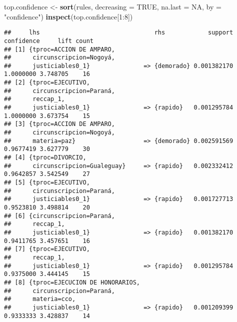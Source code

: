\documentclass[runningheads,a4paper]{llncs}
\newenvironment{Shaded}{\footnotesize}{}
\newcommand{\KeywordTok}[1]{\textcolor[rgb]{0.00,0.44,0.13}{\textbf{{#1}}}}
\newcommand{\DataTypeTok}[1]{\textcolor[rgb]{0.56,0.13,0.00}{{#1}}}
\newcommand{\DecValTok}[1]{\textcolor[rgb]{0.25,0.63,0.44}{{#1}}}
\newcommand{\StringTok}[1]{\textcolor[rgb]{0.25,0.44,0.63}{{#1}}}
\newcommand{\OtherTok}[1]{\textcolor[rgb]{0.00,0.44,0.13}{{#1}}}
\newcommand{\NormalTok}[1]{{#1}}
\newcommand{\OperatorTok}[1]{\textcolor[rgb]{0.40,0.40,0.40}{{#1}}}
\begin{document}
\scriptsize

\begin{Shaded}
\begin{Highlighting}[]
\NormalTok{top.confidence <-}\StringTok{ }\KeywordTok{sort}\NormalTok{(rules, }\DataTypeTok{decreasing =} \OtherTok{TRUE}\NormalTok{, }
                       \DataTypeTok{na.last =} \OtherTok{NA}\NormalTok{, }\DataTypeTok{by =} \StringTok{"confidence"}\NormalTok{)}
\KeywordTok{inspect}\NormalTok{(top.confidence[}\DecValTok{1}\OperatorTok{:}\DecValTok{8}\NormalTok{])}
\end{Highlighting}
\end{Shaded}

\begin{verbatim}
##     lhs                                rhs            support confidence     lift count
## [1] {tproc=ACCION DE AMPARO,                                                           
##      circunscripcion=Nogoyá,                                                           
##      justiciables0_1}               => {demorado} 0.001382170  1.0000000 3.748705    16
## [2] {tproc=EJECUTIVO,                                                                  
##      circunscripcion=Paraná,                                                           
##      reccap_1,                                                                         
##      justiciables0_1}               => {rapido}   0.001295784  1.0000000 3.673754    15
## [3] {tproc=ACCION DE AMPARO,                                                           
##      circunscripcion=Nogoyá,                                                           
##      materia=paz}                   => {demorado} 0.002591569  0.9677419 3.627779    30
## [4] {tproc=DIVORCIO,                                                                   
##      circunscripcion=Gualeguay}     => {rapido}   0.002332412  0.9642857 3.542549    27
## [5] {tproc=EJECUTIVO,                                                                  
##      circunscripcion=Paraná,                                                           
##      justiciables0_1}               => {rapido}   0.001727713  0.9523810 3.498814    20
## [6] {circunscripcion=Paraná,                                                           
##      reccap_1,                                                                         
##      justiciables0_1}               => {rapido}   0.001382170  0.9411765 3.457651    16
## [7] {tproc=EJECUTIVO,                                                                  
##      reccap_1,                                                                         
##      justiciables0_1}               => {rapido}   0.001295784  0.9375000 3.444145    15
## [8] {tproc=EJECUCION DE HONORARIOS,                                                    
##      circunscripcion=Paraná,                                                           
##      materia=cco,                                                                      
##      justiciables0_1}               => {rapido}   0.001209399  0.9333333 3.428837    14
\end{verbatim}
\end{document}
